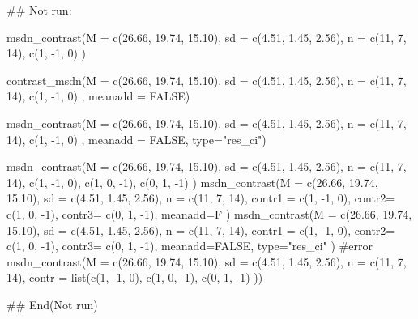 \documentclass[a4paper]{book}
\begin{document}
\begin{Examples}
\begin{ExampleCode}
\#\# Not run: 


msdn_contrast(M = c(26.66, 19.74, 15.10),
              sd = c(4.51, 1.45, 2.56),
              n = c(11, 7, 14),
              c(1, -1, 0) )

contrast_msdn(M = c(26.66, 19.74, 15.10),
              sd = c(4.51, 1.45, 2.56),
              n = c(11, 7, 14),
              c(1, -1, 0) ,
              meanadd = FALSE)

msdn_contrast(M = c(26.66, 19.74, 15.10),
              sd = c(4.51, 1.45, 2.56),
              n = c(11, 7, 14),
              c(1, -1, 0) ,
             meanadd = FALSE,
              type="res_ci")


msdn_contrast(M = c(26.66, 19.74, 15.10),
              sd = c(4.51, 1.45, 2.56),
             n = c(11, 7, 14),
              c(1, -1,  0),
              c(1,  0, -1),
              c(0,  1, -1)
)
msdn_contrast(M = c(26.66, 19.74, 15.10),
              sd = c(4.51, 1.45, 2.56),
              n = c(11, 7, 14),
              contr1 = c(1, -1,  0),
              contr2= c(1,  0, -1),
              contr3= c(0,  1, -1),
              meanadd=F
)
msdn_contrast(M = c(26.66, 19.74, 15.10),
              sd = c(4.51, 1.45, 2.56),
              n = c(11, 7, 14),
             contr1 = c(1, -1,  0),
             contr2= c(1,  0, -1),
              contr3= c(0,  1, -1),
              meanadd=FALSE, type="res_ci"
)
#error
msdn_contrast(M = c(26.66, 19.74, 15.10),
              sd = c(4.51, 1.45, 2.56),
             n = c(11, 7, 14),
              contr = list(c(1, -1,  0),
                            c(1,  0, -1),
                           c(0,  1, -1)
              ))



## End(Not run)
\end{ExampleCode}
\end{Examples}
\end{document}
